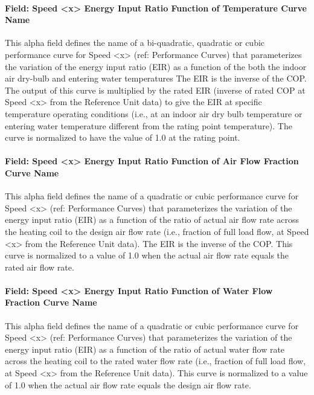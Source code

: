 \paragraph{Field: Speed \textless{}x\textgreater{} Energy Input Ratio Function of Temperature Curve Name}\label{field-speed-x-energy-input-ratio-function-of-temperature-curve-name-5}

This alpha field defines the name of a bi-quadratic, quadratic or cubic performance curve for Speed \textless{}x\textgreater{} (ref: Performance Curves) that parameterizes the variation of the energy input ratio (EIR) as a function of the both the indoor air dry-bulb and entering water temperatures The EIR is the inverse of the COP. The output of this curve is multiplied by the rated EIR (inverse of rated COP at Speed \textless{}x\textgreater{} from the Reference Unit data) to give the EIR at specific temperature operating conditions (i.e., at an indoor air dry bulb temperature or entering water temperature different from the rating point temperature). The curve is normalized to have the value of 1.0 at the rating point.

\paragraph{Field: Speed \textless{}x\textgreater{} Energy Input Ratio Function of Air Flow Fraction Curve Name}\label{field-speed-x-energy-input-ratio-function-of-air-flow-fraction-curve-name-3}

This alpha field defines the name of a quadratic or cubic performance curve for Speed \textless{}x\textgreater{} (ref: Performance Curves) that parameterizes the variation of the energy input ratio (EIR) as a function of the ratio of actual air flow rate across the heating coil to the design air flow rate (i.e., fraction of full load flow, at Speed \textless{}x\textgreater{} from the Reference Unit data). The EIR is the inverse of the COP. This curve is normalized to a value of 1.0 when the actual air flow rate equals the rated air flow rate.

\paragraph{Field: Speed \textless{}x\textgreater{} Energy Input Ratio Function of Water Flow Fraction Curve Name}\label{field-speed-x-energy-input-ratio-function-of-water-flow-fraction-curve-name-1}

This alpha field defines the name of a quadratic or cubic performance curve for Speed \textless{}x\textgreater{} (ref: Performance Curves) that parameterizes the variation of the energy input ratio (EIR) as a function of the ratio of actual water flow rate across the heating coil to the rated water flow rate (i.e., fraction of full load flow, at Speed \textless{}x\textgreater{} from the Reference Unit data). This curve is normalized to a value of 1.0 when the actual air flow rate equals the design air flow rate.

